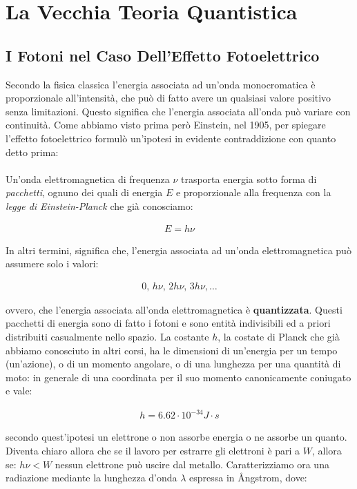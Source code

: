 \chapter{La Vecchia Teoria Quantistica}

\section{I Fotoni nel Caso Dell'Effetto Fotoelettrico}

	Secondo la fisica classica l'energia associata ad un'onda monocromatica è proporzionale all'intensità, che può di fatto avere un qualsiasi valore positivo senza limitazioni. Questo significa che l'energia associata all'onda può variare con continuità. Come abbiamo visto prima però Einstein, nel 1905, per spiegare l'effetto fotoelettrico formulò un'ipotesi in evidente contraddizione con quanto detto prima:
	\\
	\\
	Un'onda elettromagnetica di frequenza $\nu$ trasporta energia sotto forma di \textit{pacchetti}, ognuno dei quali di energia $E$ e proporzionale alla frequenza con la \textit{legge di Einstein-Planck} che già conosciamo:
	
\begin{align*}
	E = h \nu
\end{align*}

	In altri termini, significa che, l'energia associata ad un'onda elettromagnetica può assumere solo i valori:
	
\begin{align*}
	0, \, h\nu, \, 2h\nu, \, 3h\nu, \dots
\end{align*}
	
	ovvero, che l'energia associata all'onda elettromagnetica è \textbf{quantizzata}. Questi pacchetti di energia sono di fatto i fotoni e sono entità indivisibili ed a priori distribuiti casualmente nello spazio. La costante $h$, la costate di Planck che già abbiamo conosciuto in altri corsi, ha le dimensioni di un'energia per un tempo (un'azione), o di un momento angolare, o di una lunghezza per una quantità di moto: in generale di una coordinata per il suo momento canonicamente coniugato e vale:
	
\begin{align*}
	h = 6.62 \cdot 10^{-34} J \cdot s
\end{align*}

	secondo quest'ipotesi un elettrone o non assorbe energia o ne assorbe un quanto. Diventa chiaro allora che se il lavoro per estrarre gli elettroni è pari a $W$, allora se: $h\nu < W$ nessun elettrone può uscire dal metallo. Caratterizziamo ora una radiazione mediante la lunghezza d'onda $\lambda$ espressa in Ångstrom, dove:
	
